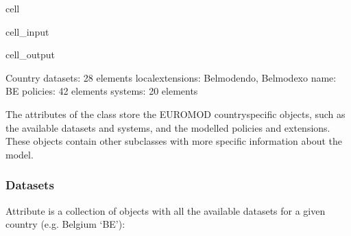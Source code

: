 \documentclass[letterpaper,10pt,english]{sphinxmanual}
\begin{document}
\begin{sphinxuseclass}{cell}
\begin{sphinxuseclass}{cell_input}
\begin{sphinxVerbatim}[commandchars=\\\{\}]
\PYG{p}{[}\PYG{p}{]}
\PYG{p}{[}\PYG{p}{]}
\PYG{p}{[}\PYG{p}{]}
\PYG{p}{[}\PYG{p}{]}
\end{sphinxVerbatim}

\end{sphinxuseclass}
\begin{sphinxuseclass}{cell_output}
\begin{sphinxVerbatim}[commandchars=\\\{\}]
\PYGZhy{}\PYGZhy{}\PYGZhy{}\PYGZhy{}\PYGZhy{}\PYGZhy{}\PYGZhy{}\PYGZhy{}\PYGZhy{}\PYGZhy{}\PYGZhy{}\PYGZhy{}\PYGZhy{}\PYGZhy{}\PYGZhy{}\PYGZhy{}\PYGZhy{}\PYGZhy{}\PYGZhy{}\PYGZhy{}\PYGZhy{}\PYGZhy{}\PYGZhy{}\PYGZhy{}\PYGZhy{}\PYGZhy{}\PYGZhy{}\PYGZhy{}\PYGZhy{}\PYGZhy{}
Country
\PYGZhy{}\PYGZhy{}\PYGZhy{}\PYGZhy{}\PYGZhy{}\PYGZhy{}\PYGZhy{}\PYGZhy{}\PYGZhy{}\PYGZhy{}\PYGZhy{}\PYGZhy{}\PYGZhy{}\PYGZhy{}\PYGZhy{}\PYGZhy{}\PYGZhy{}\PYGZhy{}\PYGZhy{}\PYGZhy{}\PYGZhy{}\PYGZhy{}\PYGZhy{}\PYGZhy{}\PYGZhy{}\PYGZhy{}\PYGZhy{}\PYGZhy{}\PYGZhy{}\PYGZhy{}
	 datasets: 28 elements
	 local\PYGZus{}extensions: Belmod\PYGZus{}endo, Belmod\PYGZus{}exo
	 name: \PYGZsq{}BE\PYGZsq{}
	 policies: 42 elements
	 systems: 20 elements
\end{sphinxVerbatim}

\end{sphinxuseclass}
\end{sphinxuseclass}
\sphinxAtStartPar
The attributes of the  class store the EUROMOD country\sphinxhyphen{}specific objects, such as the available datasets and systems, and the modelled policies and extensions. These objects contain other sub\sphinxhyphen{}classes with more specific information about the model.


\subsubsection{Datasets}
\label{\detokenize{userguide:datasets}}
\sphinxAtStartPar
Attribute  is a collection of  objects with all the available datasets for a given country (e.g. Belgium ‘BE’):
\end{document}

